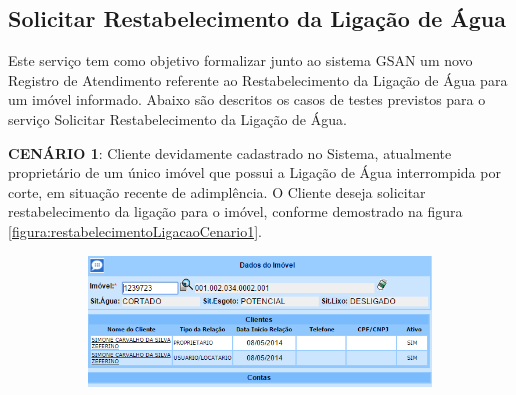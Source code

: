 \subsection{\textbf{Solicitar Restabelecimento da Ligação de Água}}
Este serviço tem como objetivo formalizar junto ao sistema GSAN um novo Registro de Atendimento referente ao Restabelecimento da Ligação de Água para um imóvel informado.
Abaixo são descritos os casos de testes previstos para o serviço Solicitar Restabelecimento da Ligação de Água.
\begin{flushleft}
	\begin{description}
		\item \textbf{CENÁRIO 1}: Cliente devidamente cadastrado no Sistema, atualmente proprietário de um único imóvel que possui a Ligação de Água interrompida por corte, em situação recente de adimplência. O Cliente deseja solicitar restabelecimento da ligação para o imóvel, conforme demostrado na figura \ref{figura:restabelecimentoLigacaoCenario1}.
		\begin{figure}[H]
			\centering
			\caption{\textbf{Restabelecimento da Ligação de Água - Cenário de Teste 1}}
			\label{figura:restabelecimentoLigacaoCenario1}
			\begin{subfigure}[H]{\textwidth}
				\centering
				\includegraphics{figuras/cenarios/restabelecimento/cenario_1.PNG}
			\end{subfigure}
		\end{figure}
	\end{description}
	

\end{flushleft}
